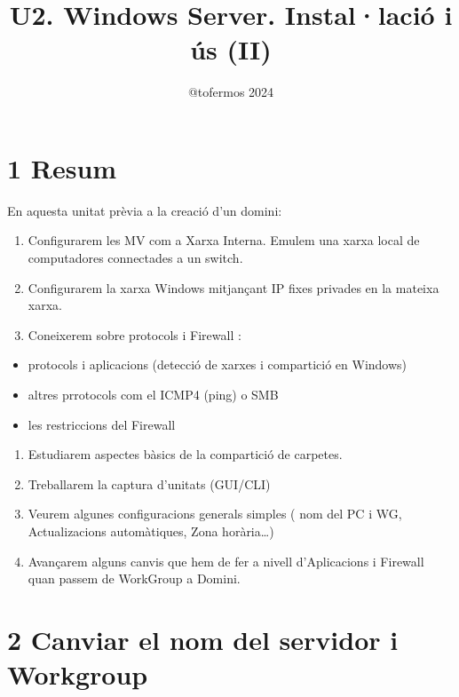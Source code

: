 \documentclass[
  a4paper,
]{article}
\title{U2. Windows Server. Instal·lació i ús (II)}
\author{@tofermos 2024}
\date{}
\providecommand{\tightlist}{%
  \setlength{\itemsep}{0pt}\setlength{\parskip}{0pt}}
\begin{document}
\maketitle

{
\setcounter{tocdepth}{2}
\tableofcontents
}
\newpage
\renewcommand\tablename{Tabla}

\section{1 Resum}\label{resum}

En aquesta unitat prèvia a la creació d'un domini:

\begin{enumerate}
\def\labelenumi{\arabic{enumi}.}
\item
  Configurarem les MV com a Xarxa Interna. Emulem una xarxa local de
  computadores connectades a un switch.
\item
  Configurarem la xarxa Windows mitjançant IP fixes privades en la
  mateixa xarxa.
\item
  Coneixerem sobre protocols i Firewall :
\end{enumerate}

\begin{itemize}
\tightlist
\item
  protocols i aplicacions (detecció de xarxes i compartició en Windows)
\item
  altres prrotocols com el ICMP4 (ping) o SMB
\item
  les restriccions del Firewall
\end{itemize}

\begin{enumerate}
\def\labelenumi{\arabic{enumi}.}
\setcounter{enumi}{3}
\item
  Estudiarem aspectes bàsics de la compartició de carpetes.
\item
  Treballarem la captura d'unitats (GUI/CLI)
\item
  Veurem algunes configuracions generals simples ( nom del PC i WG,
  Actualizacions automàtiques, Zona horària\ldots)
\item
  Avançarem alguns canvis que hem de fer a nivell d'Aplicacions i
  Firewall quan passem de WorkGroup a Domini.
\end{enumerate}

\section{2 Canviar el nom del servidor i
Workgroup}\label{canviar-el-nom-del-servidor-i-workgroup}
\end{document}
